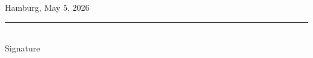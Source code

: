 \documentclass[
  letterpaper,
  11pt,
  english,
  singlespacing,
  headsepline,
  openany]{MastersDoctoralThesis}
\begin{document}
\vspace{3cm}

\noindent
\begin{minipage}[t]{0.45\textwidth}
\raggedright
Hamburg, May 5, 2026
\end{minipage}
\hfill
\begin{minipage}[t]{0.45\textwidth}
\raggedleft
\rule{5cm}{0.4pt}\\
Signature
\end{minipage}
\end{document}
